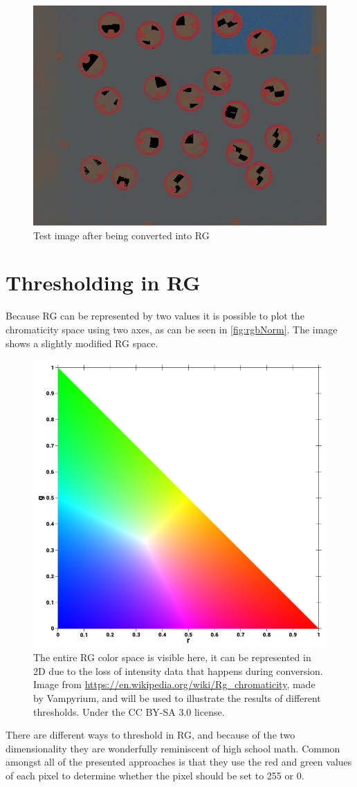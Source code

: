 \begin{figure}[H]
	\centering
	\includegraphics[width=0.6\linewidth]{figure/Analysis/rgbNorm.png}
	\caption{Test image after being converted into RG}
	\label{fig:rgsnapshot}
\end{figure} 

\section{Thresholding in RG}
Because RG can be represented by two values it is possible to plot the  chromaticity space using two axes, as can be seen in \autoref{fig:rgbNorm}. The image shows a slightly modified RG space. 
\begin{figure}[H]
	\centering
	\includegraphics[width=0.5\linewidth]{figure/Analysis/normRGB.png}
	\caption{The entire RG color space is visible here, it can be represented in 2D due to the loss of intensity data that happens during conversion. Image from \url{https://en.wikipedia.org/wiki/Rg\_chromaticity}, made by Vampyrium, and will be used to illustrate the results of different thresholds. Under the CC BY-SA 3.0 license.}
	\label{fig:rgbNorm}
\end{figure}
There are different ways to threshold in RG, and because of the two dimensionality they are wonderfully reminiscent of high school math. Common amongst all of the presented approaches is that they use the red and green values of each pixel to determine whether the pixel should be set to 255
or 0.\\

